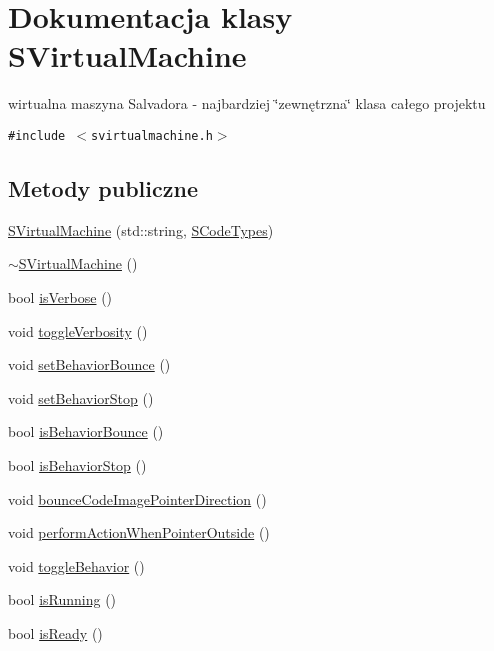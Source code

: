 \hypertarget{classSVirtualMachine}{
\section{Dokumentacja klasy SVirtualMachine}
\label{classSVirtualMachine}
}
wirtualna maszyna Salvadora - najbardziej \char`\"{}zewnętrzna\char`\"{} klasa całego projektu  


{\tt \#include $<$svirtualmachine.h$>$}

\subsection*{Metody publiczne}
\begin{CompactItemize}
\item 
\hyperlink{classSVirtualMachine_020a4e9202a688dffed1e0d8951f9164}{SVirtualMachine} (std::string, \hyperlink{senums_8h_1a2ae45552936d27425f99e1c187b043}{SCodeTypes})
\item 
\hyperlink{classSVirtualMachine_eb727bcfdf05d45526920aa512988249}{$\sim$SVirtualMachine} ()
\item 
bool \hyperlink{classSVirtualMachine_38d1e09d68d418ce34ae46d6a9dbb6dd}{isVerbose} ()
\item 
void \hyperlink{classSVirtualMachine_d099907121223d24b1a599a3518cf3b0}{toggleVerbosity} ()
\item 
void \hyperlink{classSVirtualMachine_0b29c76aa5023f0fe0b1237024ca5103}{setBehaviorBounce} ()
\item 
void \hyperlink{classSVirtualMachine_6d7c9f2fe223810123062d1c74ae542a}{setBehaviorStop} ()
\item 
bool \hyperlink{classSVirtualMachine_51a4d5a2dc91059e261135b150a78034}{isBehaviorBounce} ()
\item 
bool \hyperlink{classSVirtualMachine_9e4042e279737a419aa9200f8fe9f961}{isBehaviorStop} ()
\item 
void \hyperlink{classSVirtualMachine_0df11160e4aae2743ed39c65ea6d8441}{bounceCodeImagePointerDirection} ()
\item 
void \hyperlink{classSVirtualMachine_4d895936a3676ec3226383b3242be1af}{performActionWhenPointerOutside} ()
\item 
void \hyperlink{classSVirtualMachine_1d68dbb4416964707c818a550dcb10e9}{toggleBehavior} ()
\item 
bool \hyperlink{classSVirtualMachine_09f1f983396791f84947f80097351862}{isRunning} ()
\item 
bool \hyperlink{classSVirtualMachine_86dfbb99cbccd36729253cf34835c805}{isReady} ()

\end{CompactItemize}
